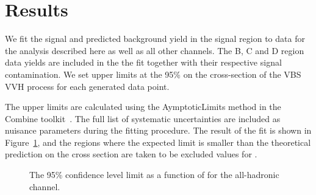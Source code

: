 \section{Results}
We fit the signal and predicted background yield in the signal region to data for the analysis described here as well as all other channels.
The B, C and D region data yields are included in the the fit together with their respective signal contamination.
We set upper limits at the 95\% \CL on the cross-section of the VBS VVH process for each \kVV generated data point.

The upper limits are calculated using the AymptoticLimits method in the Combine toolkit~\cite{Art:CombineAsymp}.
The full list of systematic uncertainties are included as nuisance parameters during the fitting procedure.
The result of the fit is shown in Figure~\ref{fig:vbsvvh_limit}, and the regions where the expected limit is smaller than the theoretical prediction on the cross section are taken to be excluded values for \kVV.

\begin{figure}[htb]
    \centering
    \caption{The 95\% confidence level limit as a function of \kVV for the all-hadronic channel. 
    }
    \label{fig:vbsvvh_limit}
\end{figure}
